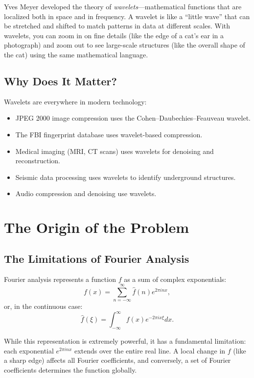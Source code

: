 Yves Meyer developed the theory of \emph{wavelets}---mathematical functions that are localized both in space and in frequency. A wavelet is like a ``little wave'' that can be stretched and shifted to match patterns in data at different scales. With wavelets, you can zoom in on fine details (like the edge of a cat's ear in a photograph) and zoom out to see large-scale structures (like the overall shape of the cat) using the same mathematical language.

\subsection{Why Does It Matter?}

Wavelets are everywhere in modern technology:
\begin{itemize}
\item JPEG 2000 image compression uses the Cohen--Daubechies--Feauveau wavelet.
\item The FBI fingerprint database uses wavelet-based compression.
\item Medical imaging (MRI, CT scans) uses wavelets for denoising and reconstruction.
\item Seismic data processing uses wavelets to identify underground structures.
\item Audio compression and denoising use wavelets.
\end{itemize}

\section{The Origin of the Problem}

\subsection{The Limitations of Fourier Analysis}

Fourier analysis represents a function $f$ as a sum of complex exponentials:
\[
f(x) = \sum_{n=-\infty}^{\infty} \hat f(n) e^{2\pi i n x},
\]
or, in the continuous case:
\[
\hat f(\xi) = \int_{-\infty}^{\infty} f(x) e^{-2\pi i x\xi} dx.
\]

While this representation is extremely powerful, it has a fundamental limitation: each exponential $e^{2\pi i n x}$ extends over the entire real line. A local change in $f$ (like a sharp edge) affects all Fourier coefficients, and conversely, a set of Fourier coefficients determines the function globally.

